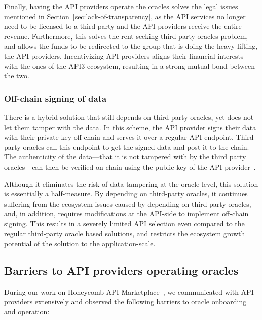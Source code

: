 \documentclass[11pt]{article}
\begin{document}
Finally, having the API providers operate the oracles solves the legal issues mentioned in Section~\ref{sec:lack-of-transparency}, as the API services no longer need to be licensed to a third party and the API providers receive the entire revenue.
Furthermore, this solves the rent-seeking third-party oracles problem, and allows the funds to be redirected to the group that is doing the heavy lifting, the API providers.
Incentivizing API providers aligns their financial interests with the ones of the API3 ecosystem, resulting in a strong mutual bond between the two.

\subsubsection{Off-chain signing of data}
\label{sec:off-chain-signing-of-data}

There is a hybrid solution that still depends on third-party oracles, yet does not let them tamper with the data.
In this scheme, the API provider signs their data with their private key off-chain and serves it over a regular API endpoint.
Third-party oracles call this endpoint to get the signed data and post it to the chain.
The authenticity of the data---that it is not tampered with by the third party oracles---can then be verified on-chain using the public key of the API provider~\cite{open-price-feed}.

Although it eliminates the risk of data tampering at the oracle level, this solution is essentially a half-measure.
By depending on third-party oracles, it continues suffering from the ecosystem issues caused by depending on third-party oracles, and, in addition, requires modifications at the API-side to implement off-chain signing.
This results in a severely limited API selection even compared to the regular third-party oracle based solutions, and restricts the ecosystem growth potential of the solution to the application-scale.

\subsection{Barriers to API providers operating oracles}
\label{sec:barriers-to-api-providers-operating-oracles}

During our work on Honeycomb API Marketplace~\cite{benligiray:2019}, we communicated with API providers extensively and observed the following barriers to oracle onboarding and operation:
\end{document}
